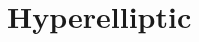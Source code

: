 \documentclass{dcthesis}
\newcommand{\PP}{\mathbb P}
\newtheorem{prop}{Proposition}[section]
\theoremstyle{definition}
\theoremstyle{remark}
\numberwithin{equation}{section}
\numberwithin{figure}{section}
\begin{document}
{  \section{Hyperelliptic}{\label{sec:hyperelliptic}
  }
}
\end{document}
